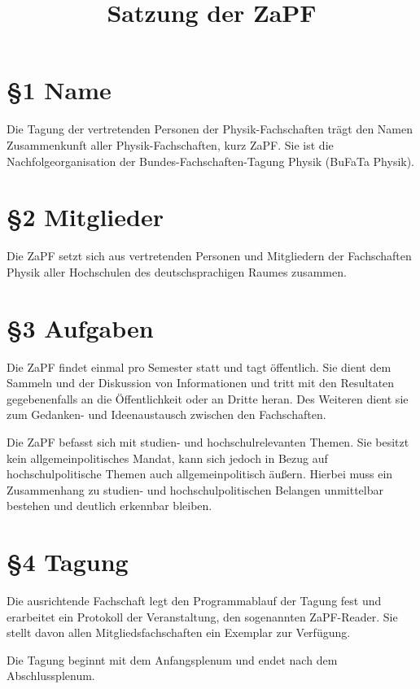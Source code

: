 \documentclass[12pt,oneside]{scrartcl}
\title{\phantomsection%
  Satzung der ZaPF%
  \label{satzung-der-zapf}}
\author{}
\date{}
\begin{document}
\maketitle


\section{§1 Name%
  \label{name}%
}

Die Tagung der vertretenden Personen der Physik-Fachschaften trägt den Namen
Zusammenkunft aller Physik-Fachschaften, kurz ZaPF.
Sie ist die Nachfolgeorganisation der Bundes-Fachschaften-Tagung Physik (BuFaTa
Physik).


\section{§2 Mitglieder%
  \label{mitglieder}%
}

Die ZaPF setzt sich aus vertretenden Personen und Mitgliedern der Fachschaften
Physik aller Hochschulen des deutschsprachigen Raumes zusammen.


\section{§3 Aufgaben%
  \label{aufgaben}%
}

Die ZaPF findet einmal pro Semester statt und tagt öffentlich.
Sie dient dem Sammeln und der Diskussion von Informationen und tritt mit den
Resultaten gegebenenfalls an die Öffentlichkeit oder an Dritte heran.
Des Weiteren dient sie zum Gedanken- und Ideenaustausch zwischen den
Fachschaften.

Die ZaPF befasst sich mit studien- und hochschulrelevanten Themen. Sie besitzt
kein allgemeinpolitisches Mandat, kann sich jedoch in Bezug auf
hochschulpolitische Themen auch allgemeinpolitisch äußern.
Hierbei muss ein Zusammenhang zu studien- und hochschulpolitischen Belangen
unmittelbar bestehen und deutlich erkennbar bleiben.


\section{§4 Tagung%
  \label{tagung}%
}

Die ausrichtende Fachschaft legt den Programmablauf der Tagung fest und
erarbeitet ein Protokoll der Veranstaltung, den sogenannten ZaPF-Reader.
Sie stellt davon allen Mitgliedsfachschaften ein Exemplar zur Verfügung.

Die Tagung beginnt mit dem Anfangsplenum und endet nach dem Abschlussplenum.
\end{document}

